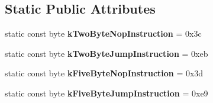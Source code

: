 \subsection*{Static Public Attributes}
\begin{DoxyCompactItemize}
\item 
static const byte {\bfseries k\+Two\+Byte\+Nop\+Instruction} = 0x3c\hypertarget{classv8_1_1internal_1_1_record_write_stub_a7ee58bc46e7fc9981b82269f06e1f764}{}\label{classv8_1_1internal_1_1_record_write_stub_a7ee58bc46e7fc9981b82269f06e1f764}

\item 
static const byte {\bfseries k\+Two\+Byte\+Jump\+Instruction} = 0xeb\hypertarget{classv8_1_1internal_1_1_record_write_stub_acde68171f7e8e8218ef09f19ce2cf6ec}{}\label{classv8_1_1internal_1_1_record_write_stub_acde68171f7e8e8218ef09f19ce2cf6ec}

\item 
static const byte {\bfseries k\+Five\+Byte\+Nop\+Instruction} = 0x3d\hypertarget{classv8_1_1internal_1_1_record_write_stub_abe06769c192b5bbec1d64faf38fbe303}{}\label{classv8_1_1internal_1_1_record_write_stub_abe06769c192b5bbec1d64faf38fbe303}

\item 
static const byte {\bfseries k\+Five\+Byte\+Jump\+Instruction} = 0xe9\hypertarget{classv8_1_1internal_1_1_record_write_stub_a9b40c982f6275aea8c57787d80050817}{}\label{classv8_1_1internal_1_1_record_write_stub_a9b40c982f6275aea8c57787d80050817}

\end{DoxyCompactItemize}
